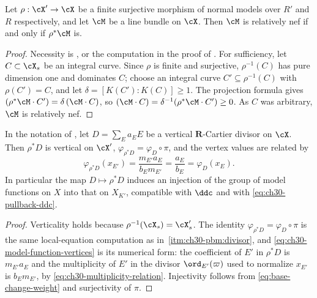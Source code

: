 \begin{lemma}
\label{lem:ch30-semipositivity-descends}
Let \(\rho:\cX'\to\cX\) be a finite surjective morphism of normal models
over \(R'\) and \(R\) respectively, and let \(\cM\) be a line bundle on
\(\cX\).  Then \(\cM\) is relatively nef if and only if \(\rho^*\cM\) is.
\end{lemma}

\begin{proof}
Necessity is , or the computation in the proof of
.  For sufficiency, let
\(C\subset\cX_s\) be an integral curve.  Since \(\rho\) is finite and
surjective, \(\rho^{-1}(C)\) has pure dimension one and dominates \(C\);
choose an integral curve \(C'\subseteq\rho^{-1}(C)\) with
\(\rho(C')=C\), and let \(\delta=[K(C'):K(C)]\geq1\).  The projection
formula gives \((\rho^*\cM\cdot C')=\delta\,(\cM\cdot C)\), so
\((\cM\cdot C)=\delta^{-1}(\rho^*\cM\cdot C')\geq0\).  As \(C\) was
arbitrary, \(\cM\) is relatively nef.
\end{proof}

\begin{lemma}
\label{lem:ch30-base-change-model-function}
In the notation of , let
\(D=\sum_Ea_EE\) be a vertical \(\mathbf R\)-Cartier divisor on \(\cX\).
Then \(\rho^*D\) is vertical on \(\cX'\),
\(\varphi_{\rho^*D}=\varphi_D\circ\pi\), and the vertex values are related
by
\begin{equation}
\label{eq:ch30-model-function-vertices}
 \varphi_{\rho^*D}(x_{E'})=\frac{m_{E'}a_E}{b_Em_{E'}}
                          =\frac{a_E}{b_E}=\varphi_D(x_E).
\end{equation}
In particular the map \(D\mapsto\rho^*D\) induces an injection of the group
of model functions on \(X\) into that on \(X_{K'}\), compatible with
\(\ddc\) and with \eqref{eq:ch30-pullback-ddc}.
\end{lemma}

\begin{proof}
Verticality holds because \(\rho^{-1}(\cX_s)=\cX'_s\).  The identity
\(\varphi_{\rho^*D}=\varphi_D\circ\pi\) is the same local-equation
computation as in
\,\cref{itm:ch30-pbm:divisor}, and
\eqref{eq:ch30-model-function-vertices} is its numerical form: the
coefficient of \(E'\) in \(\rho^*D\) is \(m_{E'}a_E\) and the multiplicity
of \(E'\) in the divisor \(\ord_{E'}(\varpi)\) used to normalize
\(x_{E'}\) is \(b_Em_{E'}\), by
\eqref{eq:ch30-multiplicity-relation}.  Injectivity follows from
\eqref{eq:base-change-weight} and surjectivity of \(\pi\).
\end{proof}

